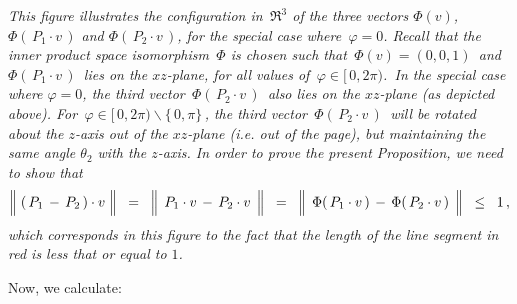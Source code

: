 \begin{center}
\vskip 0.8cm

\vskip 0.5cm
\begin{minipage}{6.0in}
\textit{This figure illustrates the configuration in \,$\Re^{3}$ of the three vectors
$\Phi(v)$, $\Phi(\,P_{1}\cdot v\,)$ and $\Phi(\,P_{2}\cdot v\,)$,
for the special case where \,$\varphi = 0$.
Recall that the inner product space isomorphism \,$\Phi$
is chosen such that \,$\Phi(v) = (0,0,1)$\, and
\,$\Phi(\,P_{1}\cdot v\,)$\, lies on the $xz$-plane, for all values of \,$\varphi \in [\,0,2\pi)$.\,
In the special case where $\varphi = 0$, the third vector \,$\Phi(\,P_{2}\cdot v\,)$\,
also lies on the $xz$-plane (as depicted above).
For \,$\varphi \in [\,0,2\pi) \backslash \{\,0,\pi\}$\,,
the third vector \,$\Phi(\,P_{2}\cdot v\,)$\,
will be rotated about the $z$-axis out of the $xz$-plane (i.e. out of the page),
but maintaining the same angle $\theta_{2}$ with the $z$-axis.
\vskip 0.2cm
\noindent
In order to prove the present Proposition, we need to show that
\begin{equation*}
\left\Vert\; (\,P_{1} \,\overset{{\color{white}.}}{-}\, P_{2}\,)\cdot v \;\right\Vert
\;\; = \;\;
	\left\Vert\;\, P_{1}\cdot v \,\overset{{\color{white}.}}{-}\, P_{2}\cdot v \,\;\right\Vert
\;\; = \;\;
	\left\Vert\;\, \Phi(\,P_{1}\cdot v\,) \,\overset{{\color{white}.}}{-}\, \Phi(\,P_{2}\cdot v\,) \,\;\right\Vert
\;\;\leq\;\;
	1\,,
\end{equation*}
which corresponds in this figure to the fact that the length of the line segment in red is less that or equal to $1$.
}
\end{minipage}
\end{center}
\vskip 0.5cm
Now, we calculate:
